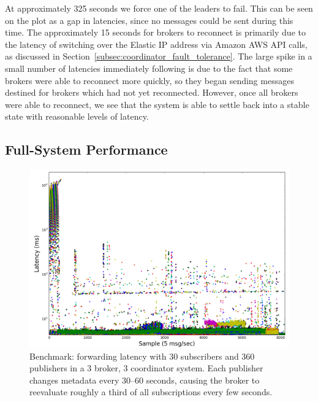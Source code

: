 At approximately 325 seconds we force one of the leaders to fail.
This can be seen on the plot as a gap in latencies, since no messages could be sent during this time.
The approximately 15 seconds for brokers to reconnect is primarily due to the latency of switching over the Elastic IP address via Amazon AWS API calls, as discussed in Section~\ref{subsec:coordinator_fault_tolerance}.
The large spike in a small number of latencies immediately following is due to the fact that some brokers were able to reconnect more quickly, so they began sending messages destined for brokers which had not yet reconnected.
However, once all brokers were able to reconnect, we see that the system is able to settle back into a stable state with reasonable levels of latency.

\subsection{Full-System Performance}

\begin{figure}[t]
\centering
\includegraphics[width=\linewidth]{figs/fullsystem_metadatachange.png}
\caption{Benchmark: forwarding latency with 30 subscribers and 360 publishers in a 3 broker, 3 coordinator system. Each publisher changes metadata every 30--60 seconds, causing the broker to reevaluate roughly a third of all subscriptions every few seconds.}
\label{fig:fullsystem_metadatachange}
\end{figure}

